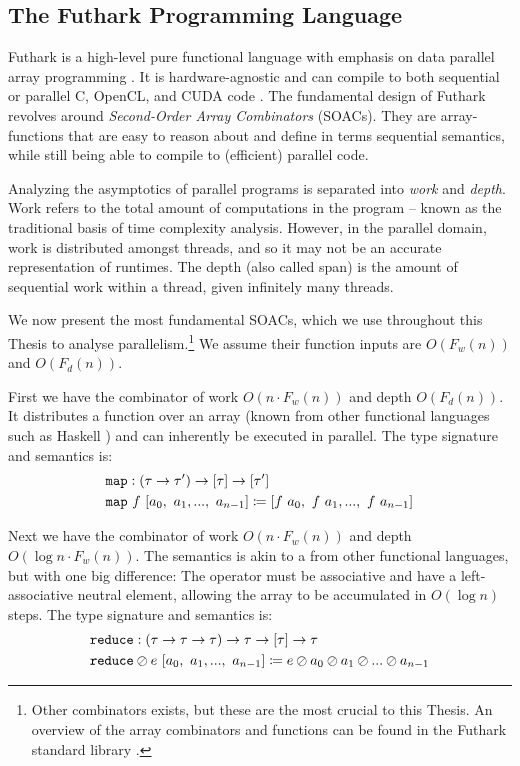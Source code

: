 \subsection{The Futhark Programming Language}
\label{subsec:futhark}

Futhark is a high-level pure functional language with emphasis on data parallel
array programming
\cite{ParallelProgrammingInFuthark,Henriksen:2017:FPF:3062341.3062354}. It is
hardware-agnostic and can compile to both sequential or parallel C, OpenCL, and
CUDA code \cite{futguide2}. The fundamental design of Futhark revolves around
\textit{Second-Order Array Combinators} (SOACs). They are array-functions that
are easy to reason about and define in terms sequential semantics, while still
being able to compile to (efficient) parallel code.

Analyzing the asymptotics of parallel programs is separated into \textit{work}
and \textit{depth}. Work refers to the total amount of computations in the
program -- known as the traditional basis of time complexity analysis. However,
in the parallel domain, work is distributed amongst threads, and so it may not
be an accurate representation of runtimes. The depth (also called span) is the
amount of sequential work within a thread, given infinitely many threads.

We now present the most fundamental SOACs, which we use throughout this Thesis
to analyse parallelism.\footnote{Other combinators exists, but these are the
  most crucial to this Thesis. An overview of the array combinators and
  functions can be found in the Futhark standard library \cite{futprelude}.} We
assume their function inputs are $O(F_{w}(n))$ and $O(F_d(n))$.

First we have the combinator  of work $O(n\cdot F_w(n))$ and depth
$O(F_d(n))$. It distributes a function over an array (known from other
functional languages such as Haskell \cite{marlow2010haskell}) and can
inherently be executed in parallel. The type signature and semantics is:
\begin{align}
  &\mathtt{map}:(\tau \to \tau') \to \mathtt{[}\tau\mathtt{]} \to \mathtt{[}\tau'\mathtt{]}\\
  &\mathtt{map}~f~[a_0,~a_1,...,~a_{n-1}] \coloneq [f~a_0,~f~a_1,...,~f~a_{n-1}]
\end{align}

Next we have the combinator  of work $O(n\cdot F_w(n))$ and depth
$O(\log n \cdot F_w(n))$.  The semantics is akin to a  from other
functional languages, but with one big difference: The operator must be
associative and have a left-associative neutral element, allowing the array to
be accumulated in $O(\log n)$ steps. The type signature and semantics is:
\begin{align}
  &\mathtt{reduce}:(\tau \to \tau \to \tau) \to \tau \to \mathtt{[}\tau\mathtt{]} \to \tau\\
  & \mathtt{reduce} \oslash e~[a_0,~a_1,...,~a_{n-1}] \coloneq e \oslash a_0 \oslash a_1 \oslash ...\oslash a_{n-1}
\end{align}

